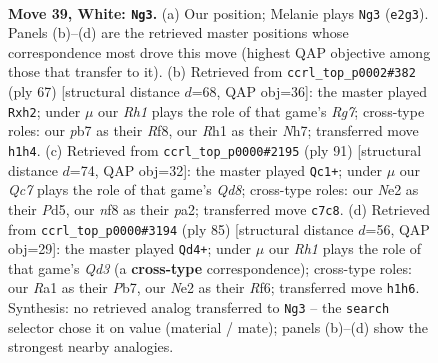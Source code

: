 \documentclass[11pt]{article}
\begin{document}
\clearpage

\begin{figure}[p]\centering
\begin{subfigure}{0.46\textwidth}\centering
\resizebox{\linewidth}{!}{%
\newchessgame
\chessboard[
  setfen={5n1k/ppQ4p/7p/1r6/3P4/5q2/4N3/R5KR w - - 2 39},
  showmover=false,
  pgfstyle=straightmove, color=movearrow, markmove={e2-g3}
]}
\caption{}
\end{subfigure}\hfill
\begin{subfigure}{0.46\textwidth}\centering
\resizebox{\linewidth}{!}{%
\newchessgame
\chessboard[
  setfen={5r1k/2q4n/p2N1p2/8/4Q3/8/PPP1N1rP/1K1R4 b - - 3 34},
  showmover=false,
  pgfstyle=straightmove, color=movearrow, markmove={g2-h2}
]}
\caption{}
\end{subfigure}
\\[4pt]
\begin{subfigure}{0.46\textwidth}\centering
\resizebox{\linewidth}{!}{%
\newchessgame
\chessboard[
  setfen={6R1/kr6/2Q1p2p/3p4/1P6/K1P5/P5P1/3q4 b - - 6 46},
  showmover=false,
  pgfstyle=straightmove, color=movearrow, markmove={d1-c1}
]}
\caption{}
\end{subfigure}\hfill
\begin{subfigure}{0.46\textwidth}\centering
\resizebox{\linewidth}{!}{%
\newchessgame
\chessboard[
  setfen={5k2/1p6/3q1r2/6Q1/6P1/3N1P2/P3r1P1/2R3K1 b - - 14 43},
  showmover=false,
  pgfstyle=straightmove, color=movearrow, markmove={d6-d4}
]}
\caption{}
\end{subfigure}
\caption{\textbf{Move 39, White: \texttt{Ng3}.} (a) Our position; Melanie plays \texttt{Ng3} (\texttt{e2g3}). Panels (b)--(d) are the retrieved master positions whose correspondence most drove this move (highest QAP objective among those that transfer to it). (b) Retrieved from \texttt{ccrl\_top\_p0002\#382} (ply 67) [structural distance $d$=68, QAP obj=36]: the master played \texttt{Rxh2}; under $\mu$ our \emph{Rh1} plays the role of that game's \emph{Rg7}; cross-type roles: our \emph{p}b7 as their \emph{R}f8, our \emph{R}h1 as their \emph{N}h7; transferred move \texttt{h1h4}. (c) Retrieved from \texttt{ccrl\_top\_p0000\#2195} (ply 91) [structural distance $d$=74, QAP obj=32]: the master played \texttt{Qc1+}; under $\mu$ our \emph{Qc7} plays the role of that game's \emph{Qd8}; cross-type roles: our \emph{N}e2 as their \emph{P}d5, our \emph{n}f8 as their \emph{p}a2; transferred move \texttt{c7c8}. (d) Retrieved from \texttt{ccrl\_top\_p0000\#3194} (ply 85) [structural distance $d$=56, QAP obj=29]: the master played \texttt{Qd4+}; under $\mu$ our \emph{Rh1} plays the role of that game's \emph{Qd3} (a \textbf{cross-type} correspondence); cross-type roles: our \emph{R}a1 as their \emph{P}b7, our \emph{N}e2 as their \emph{R}f6; transferred move \texttt{h1h6}. Synthesis: no retrieved analog transferred to \texttt{Ng3} -- the \texttt{search} selector chose it on value (material / mate); panels (b)--(d) show the strongest nearby analogies.}
\label{fig:thought-m76}
\end{figure}
\end{document}
